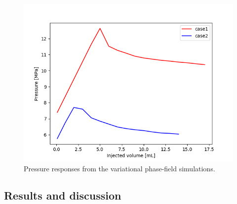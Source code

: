 \begin{figure}[!ht]
\centering
\includegraphics[width=1.0\textwidth]{figures/Keita_ME2_pressures.png}
\caption{Pressure responses from the variational phase-field simulations.}
\label{fig:Keita_ME2_VPF_pres}
\end{figure}

\subsection{Results and discussion}

